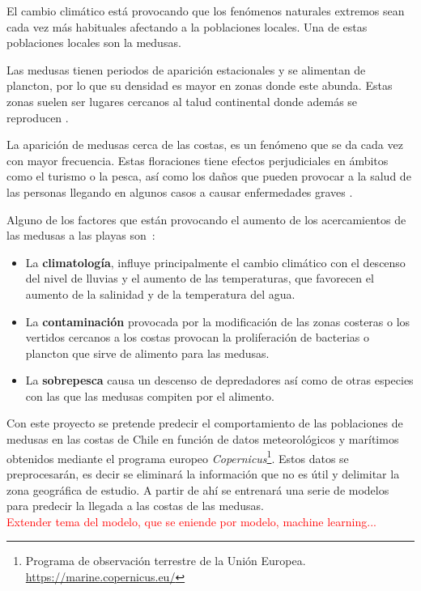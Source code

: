 
\begin{comment}
Descripción del contenido del trabajo y del estrucutra de la memoria y del resto de materiales entregados.
\end{comment}

El cambio climático está provocando que los fenómenos naturales extremos sean cada vez más habituales afectando a la poblaciones locales. Una de estas poblaciones locales son la medusas.

Las medusas tienen periodos de aparición estacionales y se alimentan de plancton, por lo que su densidad es mayor en zonas donde este abunda. Estas zonas suelen ser lugares cercanos al talud continental donde además se reproducen \cite{noauthor_proliferaciones_nodate}. %

La aparición de medusas cerca de las costas, es un fenómeno que se da cada vez con mayor frecuencia. Estas floraciones tiene efectos perjudiciales en ámbitos como el turismo o la pesca, así como los daños que pueden provocar a la salud de las personas llegando en algunos casos a causar enfermedades graves \cite{art:picaduras_1,art:picaduras_2}. 

Alguno de los factores que están provocando el aumento de los acercamientos de las medusas a las playas son~\cite{noauthor_proliferaciones_nodate,art:ArticuloCanepa_1}:
\begin{itemize}
	\item La \textbf{climatología}, influye principalmente el cambio climático con el descenso del nivel de lluvias y el aumento de las temperaturas, que favorecen el aumento de la salinidad y de la temperatura del agua. 
	\item La \textbf{contaminación} provocada por la modificación de las zonas costeras o los vertidos cercanos a los costas provocan la proliferación de bacterias o plancton que sirve de alimento para las medusas.
	\item La \textbf{sobrepesca} causa un descenso de depredadores así como de otras especies con las que las medusas compiten por el alimento.
\end{itemize}

Con este proyecto se pretende predecir el comportamiento de las poblaciones de medusas en las costas de Chile en función de datos meteorológicos y marítimos obtenidos mediante el programa europeo \emph{Copernicus}\footnote{Programa de observación terrestre de la Unión Europea. \url{https://marine.copernicus.eu/}}. Estos datos se preprocesarán, es decir se eliminará la información que no es útil y delimitar la zona geográfica de estudio. A partir de ahí se entrenará una serie de modelos para predecir la llegada a las costas de las medusas.\\
\textcolor{red}{Extender tema del modelo, que se eniende por modelo, machine learning...}